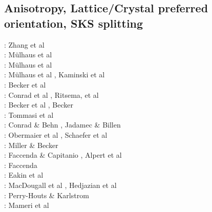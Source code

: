 \subsection{Anisotropy, Lattice/Crystal preferred orientation, SKS splitting}
\label{sec:topics:anisotropy}

\begin{scriptsize}
\nineteeneightythree: Zhang et al \cite{zhhj93}\\
\twothousandtwo: M\"ulhaus et al \cite{mudm02}\\
\twothousandthree: M\"ulhaus et al \cite{mumc03}\\
\twothousandfour: M\"ulhaus et al \cite{mumc04}, Kaminski et al \cite{karb04}\\
\twothousandsix: Becker et al \cite{besb06}\\
\twothousandseven: Conrad et al \cite{cobs07}, Ritsema, et al \cite{rimb07}\\
\twothousandeight: Becker et al \cite{beke08}, Becker \cite{beck08}\\
\twothousandnine: Tommasi et al \cite{tokv09}\\
\twothousandten: Conrad \& Behn \cite{cobe10}, Jadamec \& Billen \cite{jabi10a}\\
\twothousandeleven: Obermaier et al \cite{obbh11}, Schaefer et al \cite{scbb11}\\
\twothousandtwelve: Miller \& Becker \cite{mibe12}\\
\twothousandthirteen: Faccenda \& Capitanio \cite{faca13}, Alpert et al \cite{almb13}\\
\twothousandfourteen: Faccenda \cite{facc14}\\
\twothousandfifteen: Eakin et al \cite{ealw15}\\
\twothousandseventeen: MacDougall et al \cite{majf17}, Hedjazian et al \cite{hegd17}\\
\twothousandeighteen: Perry-Houts \& Karlstrom \cite{peka18}\\
\twothousandnineteen: Mameri et al \cite{mats19}
\end{scriptsize}

